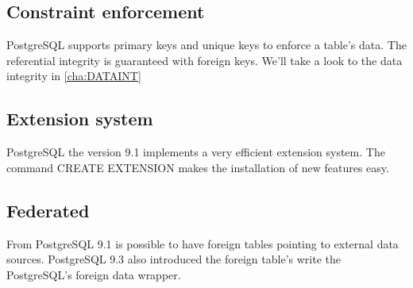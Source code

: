 \subsection{Constraint enforcement}
PostgreSQL supports primary keys and unique keys to enforce a table's data. The referential integrity 
is guaranteed with foreign keys. We'll take a look to the data integrity in \ref{cha:DATAINT}

\subsection{Extension system}
PostgreSQL the version 9.1 implements a very efficient extension system. The command CREATE 
EXTENSION makes the installation of new features easy.

\subsection{Federated}
From PostgreSQL 9.1 is possible to have foreign tables pointing to external data sources. 
PostgreSQL 9.3 also introduced the foreign table's write the PostgreSQL's foreign data 
wrapper.
